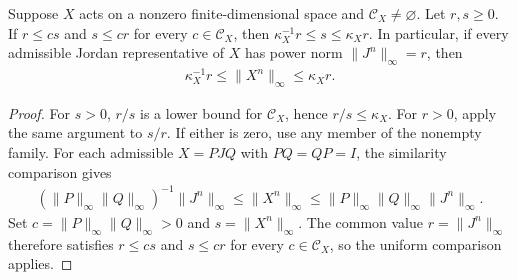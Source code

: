 \begin{theorem}
    \label{thm:wolf_jordan_infimum_comparison}
    \leanok
    Suppose $X$ acts on a nonzero finite-dimensional space and
    $\mathcal C_X\ne\varnothing$. Let $r,s\ge0$. If $r\le cs$ and $s\le cr$
    for every $c\in\mathcal C_X$, then $\kappa_X^{-1}r\le s\le\kappa_Xr$.
    In particular, if every admissible Jordan representative of $X$ has
    power norm $\lVert J^n\rVert_\infty=r$, then
    \begin{align}
      \kappa_X^{-1}r\le\lVert X^n\rVert_\infty\le\kappa_Xr.
    \end{align}
\end{theorem}
\begin{proof}
    \leanok
    For $s>0$, $r/s$ is a lower bound for $\mathcal C_X$, hence
    $r/s\le\kappa_X$. For $r>0$, apply the same argument to $s/r$.
    If either is zero, use any member of the nonempty family.
    For each admissible $X=PJQ$ with $PQ=QP=I$, the similarity comparison gives
    \begin{align}
      (\lVert P\rVert_\infty\lVert Q\rVert_\infty)^{-1}
        \lVert J^n\rVert_\infty
      \le\lVert X^n\rVert_\infty
      \le\lVert P\rVert_\infty\lVert Q\rVert_\infty
        \lVert J^n\rVert_\infty.
    \end{align}
    Set $c=\lVert P\rVert_\infty\lVert Q\rVert_\infty>0$ and
    $s=\lVert X^n\rVert_\infty$. The common value
    $r=\lVert J^n\rVert_\infty$ therefore satisfies $r\le cs$ and $s\le cr$
    for every $c\in\mathcal C_X$, so the uniform comparison applies.
\end{proof}

